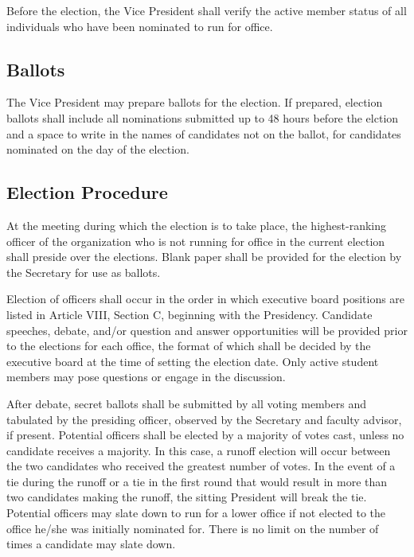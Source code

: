 \documentclass{article}
\begin{document}
Before the election, the Vice President shall verify the active member status of all individuals who have been nominated to run for office.

\subsection{Ballots}
The Vice President may prepare ballots for the election. If prepared, election ballots shall include all nominations submitted up to 48 hours before the elction and a space to write in the names of candidates not on the ballot, for candidates nominated on the day of the election.

\subsection{Election Procedure}

At the meeting during which the election is to take place, the highest-ranking officer of the organization who is not running for office in the current election shall preside over the elections. Blank paper shall be provided for the election by the Secretary for use as ballots.

Election of officers shall occur in the order in which executive board positions are listed in Article VIII, Section C, beginning with the Presidency. Candidate speeches, debate, and/or question and answer opportunities will be provided prior to the elections for each office, the format of which shall be decided by the executive board at the time of setting the election date. Only active student members may pose questions or engage in the discussion.

After debate, secret ballots shall be submitted by all voting members and tabulated by the presiding officer, observed by the Secretary and faculty advisor, if present. Potential officers shall be elected by a majority of votes cast, unless no candidate receives a majority. In this case, a runoff election will occur between the two candidates who received the greatest number of votes. In the event of a tie during the runoff or a tie in the first round that would result in more than two candidates making the runoff, the sitting President will break the tie. Potential officers may slate down to run for a lower office if not elected to the office he/she was initially nominated for. There is no limit on the number of times a candidate may slate down.
\end{document}
